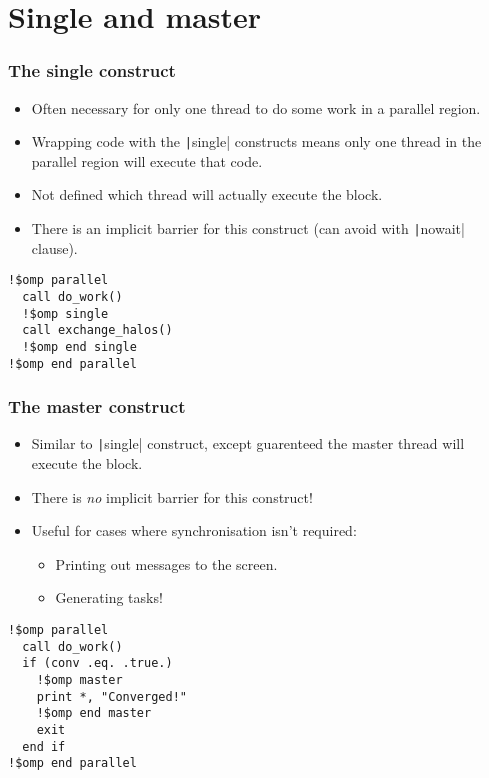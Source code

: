 \documentclass{beamer}
\begin{document}
\section{Single and master}
\begin{frame}[fragile]
\frametitle{The single construct}
\begin{itemize}
  \item Often necessary for only one thread to do some work in a parallel region.
  \item Wrapping code with the \texttt|single| constructs means only one thread in the parallel region will execute that code.
  \item Not defined which thread will actually execute the block.
  \item There is an implicit barrier for this construct (can avoid with \texttt|nowait| clause).
\end{itemize}

\begin{verbatim}
!$omp parallel
  call do_work()
  !$omp single
  call exchange_halos()
  !$omp end single
!$omp end parallel
\end{verbatim}
\end{frame}

\begin{frame}[fragile]
\frametitle{The master construct}
\begin{itemize}
  \item Similar to \texttt|single| construct, except guarenteed the master thread will execute the block.
  \item There is \emph{no} implicit barrier for this construct!
  \item Useful for cases where synchronisation isn't required:
    \begin{itemize}
      \item Printing out messages to the screen.
      \item Generating tasks!
    \end{itemize}
\end{itemize}

\begin{verbatim}
!$omp parallel
  call do_work()
  if (conv .eq. .true.)
    !$omp master
    print *, "Converged!"
    !$omp end master
    exit
  end if
!$omp end parallel
\end{verbatim}
\end{frame}
\end{document}
